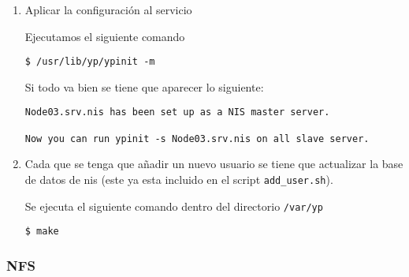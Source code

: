 \documentclass[../main.tex]{subfiles}
\begin{document}
\begin{enumerate}
  \item Aplicar la configuración al servicio

        Ejecutamos el siguiente comando
        \begin{listing}[H]
\begin{verbatim}
$ /usr/lib/yp/ypinit -m
\end{verbatim}
\end{listing}

        Si todo va bien se tiene que aparecer lo siguiente:
        \begin{listing}[H]
\begin{verbatim}
Node03.srv.nis has been set up as a NIS master server.

Now you can run ypinit -s Node03.srv.nis on all slave server.
\end{verbatim}
\end{listing}

  \item Cada que se tenga  que añadir un nuevo usuario se
        tiene que actualizar la base de datos de \acrshort{nis}\@
        (este ya esta incluido en el script \texttt{add\_user.sh}).

        Se ejecuta el siguiente comando dentro del directorio
        \texttt{/var/yp}
        \begin{listing}[H]
\begin{verbatim}
$ make
\end{verbatim}
\end{listing}

\end{enumerate}

\subsubsection{NFS}\label{sec:nfs}
\end{document}
